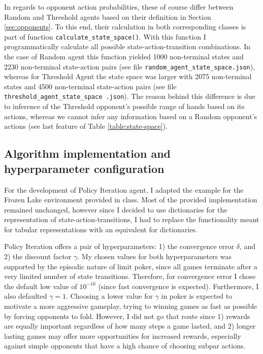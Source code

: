 In regards to opponent action probabilities, these of course differ between Random and Threshold agents based on their definition in Section \ref{sec:opponents}. To this end, their calculation in both corresponding classes is part of function \Verb|calculate_state_space()|. With this function I programmatically calculate all possible state-action-transition combinations. In the case of Random agent this function yielded 1000 non-terminal states and 2230 non-terminal state-action pairs (see file \Verb|random_agent_state_space.json|), whereas for Threshold Agent the state space was larger with 2075 non-terminal states and 4500 non-terminal state-action pairs (see file \texttt{threshold\_agent\_state\_space .json}). The reason behind this difference is due to inference of the Threshold opponent's possible range of hands based on its actions, whereas we cannot infer any information based on a Random opponent's actions (see last feature of Table \ref{table:state-space}).

\subsection{Algorithm implementation and hyperparameter configuration}

For the development of Policy Iteration agent, I adapted the example for the Frozen Lake environment provided in class. Most of the provided implementation remained unchanged, however since I decided to use dictionaries for the representation of state-action-transitions, I had to replace the functionality meant for tabular representations with an equivalent for dictionaries.

Policy Iteration offers a pair of hyperparameters: 1) the convergence error $\delta$, and 2) the discount factor $\gamma$. My chosen values for both hyperparameters was supported by the episodic nature of limit poker, since all games terminate after a very limited number of state transitions. Therefore, for convergence error I chose the default low value of $10^{-10}$ (since fast convergence is expected). Furthermore, I also defaulted $\gamma=1$. Choosing a lower value for $\gamma$ in poker is expected to motivate a more aggressive gameplay, trying to winning games as fast as possible by forcing opponents to fold. However, I did not go that route since 1) rewards are equally important regardless of how many steps a game lasted, and 2) longer lasting games may offer more opportunities for increased rewards, especially against simple opponents that have a high chance of choosing subpar actions.

